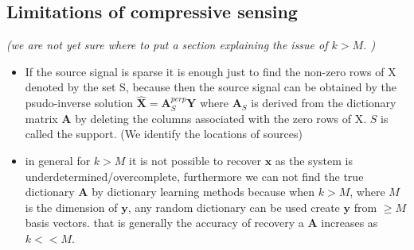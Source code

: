 

\subsection{Limitations of compressive sensing}
\textit{(we are not yet sure where to put a section explaining the issue of $k>M$. )}
\begin{itemize}
\item If the source signal is sparse it is enough just to find the non-zero rows of X denoted by the set S, because then the source signal can be obtained by the psudo-inverse solution $\hat{\mathbf{X}} = \mathbf{A}_S^{perp} \mathbf{Y}$ where $\mathbf{A}_S$ is derived from the dictionary matrix $\mathbf{A}$ by deleting the columns associated with the zero rows of X. $S$ is called the support. (We identify the locations of sources)
\item in general for $k>M$ it is not possible to recover $\textbf{x}$ as the system is underdetermined/overcomplete, furthermore we can not find the true dictionary $\textbf{A}$ by dictionary learning methods because when $k>M$, where $M$ is the dimension of $\textbf{y}$, any random dictionary can be used create $\textbf{y}$ from $\geq M$ basis vectors. that is generally the accuracy of recovery a $\textbf{A}$ increases as $k<<M$.\\
\end{itemize}


